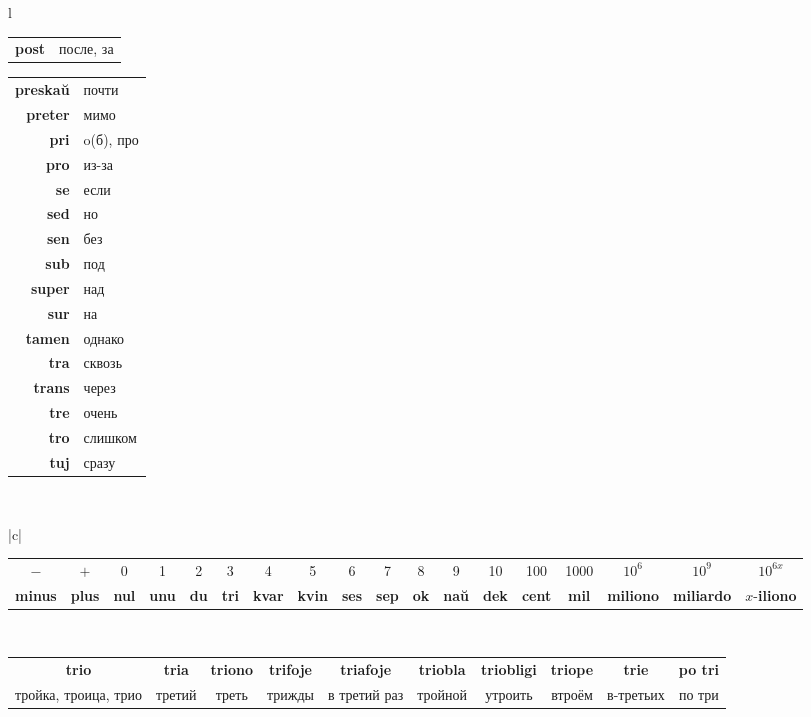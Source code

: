 \documentclass{article}
\def\b#1{\textbf{#1}}
\begin{document}
\begin{center}
\begin{tabular}{l}
\begin{tabular}{>{\bfseries}rl}
post & после, за \\
\end{tabular}
\hspace{-2em}
\begin{tabular}{>{\bfseries}rl}
preskaŭ & почти \\
preter & мимо \\
pri & o(б), про \\
pro & из-за \\
se & если \\
sed & но \\
sen & без \\
sub & под \\
super & над \\
sur & на \\
tamen & однако \\
tra & сквозь \\
trans & через \\
tre & очень \\
tro & слишком \\
tuj & сразу \\
\end{tabular}
\vspace{0.5em}\\

\begin{tabular}{|c|}
\hline
\begin{tabular}{c|c|c|c|c|c|c|c|c|c|c|c|c|c|c|c|c|c}
\vspace*{-0.3em}$-$ & $+$ & 0 & 1 & 2 & 3 & 4 & 5 & 6 & 7 & 8 & 9 & 10 & 100 & 1000 & $10^6$ & $10^9$ & $10^{6x}$ \\
\b{minus} & \b{plus} & \b{nul} & \b{unu} & \b{du} & \b{tri} & \b{kvar} & \b{kvin} & \b{ses} & \b{sep} & \b{ok} & \b{naŭ} & \b{dek} & \b{cent} & \b{mil} & \b{miliono} & \b{miliardo} & $x$-\b{iliono} \\
\end{tabular}\\
\hline
\begin{tabular}{c|c|c|c|c|c|c|c|c|c}
\vspace*{-0.3em}\b{trio} & \b{tria} & \b{triono} & \b{trifoje} & \b{triafoje} & \b{triobla} & \b{triobligi} & \b{triope} & \b{trie} & \b{po tri} \\
тройка, троица, трио & третий & треть & трижды & в третий раз & тройной & утроить & втроём  & в-третьих & по три \\
\end{tabular}\\
\hline
\end{tabular}
\vspace{0.5em}\\


\end{tabular}
\end{center}
\end{document}
